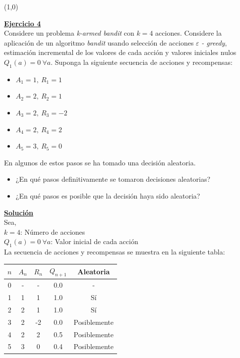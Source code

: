 \documentclass[12pt]{article}
\newlength\tindent
\renewcommand{\indent}{\hspace*{\tindent}}
\begin{document}
    \line(1,0){\textwidth}

    \indent\underline{\textbf{Ejercicio 4}}\\
    Considere un problema \textit{k-armed bandit} con $k = 4$ acciones.
    Considere la aplicación de un algoritmo \textit{bandit} usando selección de acciones $\varepsilon$ \textit{- greedy}, estimación incremental de los valores de cada acción y valores iniciales nulos $Q_{1}(a) = 0\ \forall a$.
    Suponga la siguiente secuencia de acciones y recompensas:

    \begin{itemize}
        \item $A_{1}=1,\ R_{1}=1$
        \item $A_{2}=2,\ R_{2}=1$
        \item $A_{3}=2,\ R_{3}=-2$
        \item $A_{4}=2,\ R_{4}=2$
        \item $A_{5}=3,\ R_{5}=0$
    \end{itemize}

    En algunos de estos pasos se ha tomado una decisión aleatoria.

    \begin{itemize}
        \item ¿En qué pasos definitivamente se tomaron decisiones aleatorias?
        \item ¿En qué pasos es posible que la decisión haya sido aleatoria?
    \end{itemize}

    \indent\underline{\textbf{Solución}}\\
    Sea,\\
    $k = 4$: Número de acciones \\
    $Q_{1}(a) = 0\ \forall a$: Valor inicial de cada acción \\

    La secuencia de acciones y recompensas se muestra en la siguiente tabla:

    \begin{table}[H]
        \centering
        \begin{tabular}{|c|c|c|c|c|}
            \hline
            $n$ & $A_n$ & $R_n$ & $Q_{n+1}$ & Aleatoria  \\
            \hline
            0 & - & -  & 0.0  & -               \\
            1 & 1 & 1  & 1.0  & Sí              \\
            2 & 2 & 1  & 1.0  & Sí              \\
            3 & 2 & -2 & 0.0  & Posiblemente    \\
            4 & 2 & 2  & 0.5  & Posiblemente    \\
            5 & 3 & 0  & 0.4  & Posiblemente    \\
            \hline
        \end{tabular}\label{tab:table}
    \end{table}
\end{document}
